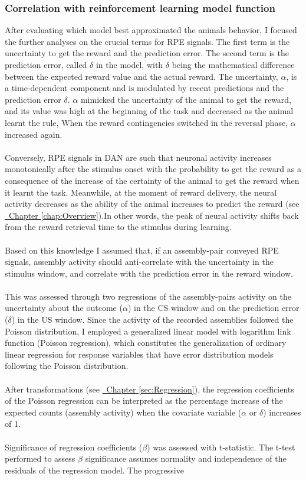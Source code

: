 \subsubsection{Correlation with reinforcement learning model function}
After evaluating which model best approximated the animals behavior, I focused the further analyses on the crucial terms for RPE signals. The first term is the uncertainty to get the reward and the prediction error. The second term is the prediction error, called $\delta$ in the model, with $\delta$ being the mathematical difference between the expected reward value and the actual reward. The uncertainty, $\alpha$, is a time-dependent component and is modulated by recent predictions and the prediction error $\delta$. $\alpha$ mimicked the uncertainty of the animal to get the reward, and its value was high at the beginning of the task and decreased as the animal learnt the rule, When the reward contingencies switched in the reversal phase, $\alpha$ increased again.\\\\Conversely, RPE signals in DAN are such that neuronal activity increases monotonically after the stimulus onset with the probability to get the reward as a consequence of the increase of the certainty of the animal to get the reward when it learnt the task. Meanwhile, at the moment of reward delivery, the neural activity decreases as the ability of the animal increases to predict the reward (see \hyperref[chap:Overview]{~Chapter \ref*{chap:Overview}}).In other words, the peak of neural activity shifts back from the reward retrieval time to the stimulus during learning.\\\\Based on this knowledge I assumed that, if an assembly-pair conveyed RPE signals, assembly activity should anti-correlate with the uncertainty in the stimulus window, and correlate with the prediction error in the reward window.\\\\This was assessed through two regressions of the assembly-pairs activity on the uncertainty about the outcome ($\alpha$) in the CS window and on the prediction error ($\delta$) in the US window. Since the activity of the recorded assemblies followed the Poisson distribution, I employed a generalized linear model with logarithm link function (Poisson regression), which constitutes the generalization of ordinary linear regression for response variables that have error distribution models following the Poisson distribution.\\\\After transformations (see \hyperref[sec:Regression]{~Chapter \ref*{sec:Regression}}), the regression coefficients of the Poisson regression can be interpreted as the percentage increase of the expected counts (assembly activity) when the covariate variable ($\alpha$ or $\delta$) increases of 1.\\\\Significance of regression coefficients ($\beta$) was assessed with t-statistic. The t-test performed to assess $\beta$ significance assumes normality and independence of the residuals of the regression model. The progressive 